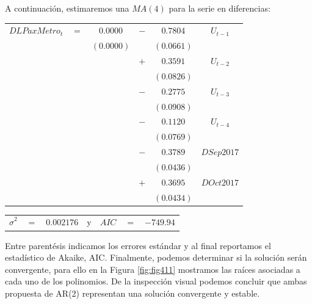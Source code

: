 \documentclass[
]{book}
\begin{document}
A continuación, estimaremos una \(MA(4)\) para la serie en diferencias:

\begin{center}
\begin{tabular}{ c c c c c c } 
    $DLPaxMetro_t$ & $=$ & $0.0000$ & $-$ & $0.7804$  & $U_{t-1}$ \\ 
    &  & $(0.0000)$ &  & $(0.0661)$ & \\
    &  &  & $+$ & $0.3591$ & $U_{t-2}$ \\
    &  &  &  & $(0.0826)$ & \\
    &  &  & $-$ & $0.2775$ & $U_{t-3}$ \\
    &  &  &  & $(0.0908)$ & \\
    &  &  & $-$ & $0.1120$ & $U_{t-4}$ \\
    &  &  &  & $(0.0769)$ & \\
    &  &  & $-$ & $0.3789$ & $DSep2017$ \\
    &  &  &  & $(0.0436)$ & \\
    &  &  & $+$ & $0.3695$ & $DOct2017$ \\
    &  &  &  & $(0.0434)$ & 
\end{tabular}
\end{center}

\begin{center}
\begin{tabular}{ c c c c c c c } 
    $\hat{\sigma}^2$ & $=$ & $0.002176$ & y & $AIC$ & $=$ & $-749.94$ 
\end{tabular}
\end{center}

Entre parentésis indicamos los errores estándar y al final reportamos el estadístico de Akaike, AIC. Finalmente, podemos determinar si la solución serán convergente, para ello en la Figura \ref{fig:fig411} mostramos las raíces asociadas a cada uno de los polinomios. De la inspección visual podemos concluir que ambas propuesta de AR(2) representan una solución convergente y estable.
\end{document}
